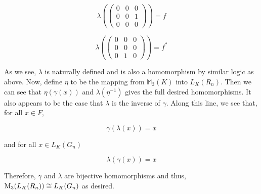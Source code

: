 \begin{solution}
    $$\lambda(\left(\begin{array}{ccc} 0 & 0 & 0 \\ 0 & 0 & 1 \\ 0 & 0 & 0 \end{array}\right))=f$$

    $$\lambda(\left(\begin{array}{ccc} 0 & 0 & 0 \\ 0 & 0 & 0 \\ 0 & 1 & 0 \end{array}\right))=f^*$$

    As we see, $\lambda$ is naturally defined and is also a homomorphism by similar logic as above. Now,
    define $\eta$ to be the mapping from $\mathbb{M}_3(K)$ into $L_K(R_n)$. Then we can see that
    $\eta(\gamma(x))$ and $\lambda(\eta^{-1})$ gives the full desired homomorphisms. It
    also appears to be the case that $\lambda$ is the inverse of $\gamma$. Along this line, we see that,
    for all $x\in F$,

    $$\gamma(\lambda(x))=x$$

    and for all $x\in L_K(G_n)$

    $$\lambda(\gamma(x))=x$$

    Therefore, $\gamma$ and $\lambda$ are bijective homomorphisms and thus,
    ${\rm M}_3(L_K(R_n))\cong L_K(G_n)$ as desired.

\end{solution}